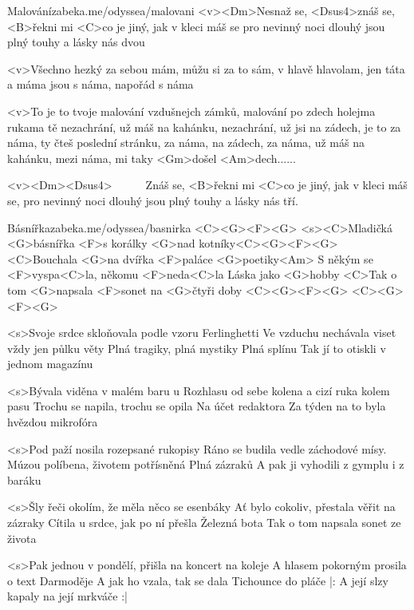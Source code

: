 \begin{song}{45}{Malování}{zabeka.me/odyssea/malovani}
	<v><Dm>Nesnaž se, <Dsus4>znáš se, <B>řekni mi <C>co je jiný,
	jak v kleci máš se pro nevinný
	noci dlouhý jsou plný touhy a lásky nás dvou 

	<v>Všechno hezký za sebou mám, můžu si za to sám, v hlavě hlavolam,
	jen táta a máma jsou s náma, napořád s náma

	<v>To je to tvoje malování vzdušnejch zámků,
	malování po zdech holejma rukama
	tě nezachrání, už máš na kahánku,
	nezachrání, už jsi na zádech,
	je to za náma, ty čteš poslední stránku, za náma, na zádech, za náma,
	už máš na kahánku, mezi náma, mi taky <Gm>došel <Am>dech......

	<v><Dm><Dsus4>\ \ \ \ \ \ Znáš se, <B>řekni mi <C>co je jiný,
	jak v kleci máš se, pro nevinný
	noci dlouhý jsou plný touhy a lásky nás tří.

\end{song}
\begin{song}{46}{Básnířka}{zabeka.me/odyssea/basnirka}
	<C><G><F><G>
	<s><C>Mladičká <G>básnířka <F>s korálky <G>nad kotníky<C><G><F><G>
	<C>Bouchala <G>na dvířka <F>paláce <G>poetiky<Am>
	S někým se <F>vyspa<C>la, někomu <F>neda<C>la
	Láska jako <G>hobby
	<C>Tak o tom <G>napsala <F>sonet na <G>čtyři doby
	<C><G><F><G>
	<C><G><F><G>

	<s>Svoje srdce skloňovala podle vzoru Ferlinghetti
	Ve vzduchu nechávala viset vždy jen půlku věty
	Plná tragiky, plná mystiky
	Plná splínu
	Tak jí to otiskli v jednom magazínu

	<s>Bývala viděna v malém baru u Rozhlasu
	od sebe kolena a cizí ruka kolem pasu
	Trochu se napila, trochu se opila
	Na účet redaktora
	Za týden na to byla hvězdou mikrofóra

	<s>Pod paží nosila rozepsané rukopisy
	Ráno se budila vedle záchodové mísy.
	Múzou políbena, životem potřísněná
	Plná zázraků
	A pak ji vyhodili z gymplu i z baráku

	<s>Šly řeči okolím, že měla něco se esenbáky
	Ať bylo cokoliv, přestala věřit na zázraky
	Cítila u srdce, jak po ní přešla
	Železná bota
	Tak o tom napsala sonet ze života

	<s>Pak jednou v pondělí, přišla na koncert na koleje
	A hlasem pokorným prosila o text Darmoděje
	A jak ho vzala, tak se dala
	Tichounce do pláče
	|: A její slzy kapaly na její mrkváče :|

\end{song}
